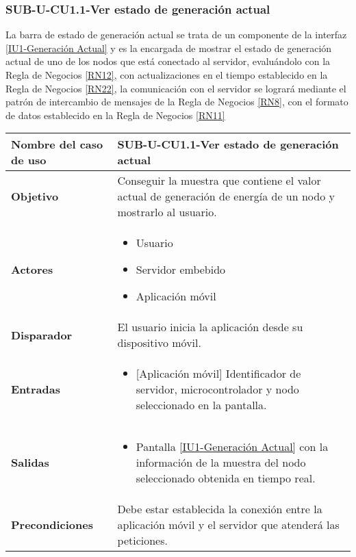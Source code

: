 \subsubsection{SUB-U-CU1.1-Ver estado de generación actual}\label{SUB-U-CU1.1}
La barra de estado de generación actual se trata de un componente de la interfaz \hyperref[fig:monitoreoReal]{[IU1-Generación Actual]} y es la encargada de mostrar el estado de generación actual de uno de los nodos que está conectado al servidor, evaluándolo con la Regla de Negocios \ref{RN12}, con actualizaciones en el tiempo establecido en la Regla de Negocios \ref{RN22}, la comunicación con el servidor se logrará mediante el patrón de intercambio de mensajes de la Regla de Negocios \ref{RN8}, con el formato de datos establecido en la Regla de Negocios \ref{RN11}   
\begin{longtable}{|J{5cm}|J{10.3cm}|}
	\hline
	\textbf{Nombre del caso de uso} &
		SUB-U-CU1.1-Ver estado de generación actual \\ \hline
	\textbf{Objetivo} &
		Conseguir la muestra que contiene el valor actual de generación de energía de un nodo y mostrarlo al usuario. \\ \hline
	\textbf{Actores} &
		\begin{itemize}
		    \item Usuario
			\item Servidor embebido
			\item Aplicación móvil
		\end{itemize} \\ \hline
	\textbf{Disparador} & 
	    El usuario inicia la aplicación desde su dispositivo móvil.\\ \hline 
	\textbf{Entradas} & 
		\begin{itemize}
				\item{[Aplicación móvil]} Identificador de servidor, microcontrolador y nodo seleccionado en la pantalla.
		\end{itemize}\\ \hline 
	\textbf{Salidas} & 
		\begin{itemize}
			\item Pantalla \hyperref[fig:monitoreoReal]{[IU1-Generación Actual]} con la información de la muestra del nodo seleccionado obtenida en tiempo real.
		\end{itemize} \\ \hline
	\textbf{Precondiciones} &
		Debe estar establecida la conexión entre la aplicación móvil y el servidor que atenderá las peticiones. \\ \hline

\end{longtable}
